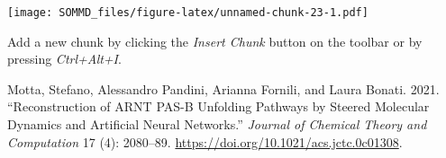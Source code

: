 \documentclass[
]{article}
\newlength{\cslhangindent}
\newlength{\cslentryspacingunit} %
\newenvironment{CSLReferences}[2] %
 {%
  \setlength{\parindent}{0pt}
  \ifodd #1
  \let\oldpar\par
  \def\par{\hangindent=\cslhangindent\oldpar}
  \fi
  \setlength{\parskip}{#2\cslentryspacingunit}
 }%
 {}
\begin{document}
\texttt{[image: SOMMD\_files/figure-latex/unnamed-chunk-23-1.pdf]}

Add a new chunk by clicking the \emph{Insert Chunk} button on the
toolbar or by pressing \emph{Ctrl+Alt+I}.

\hypertarget{refs}{}
\begin{CSLReferences}{1}{0}
\leavevmode{}%
Motta, Stefano, Alessandro Pandini, Arianna Fornili, and Laura Bonati.
2021. {``Reconstruction of ARNT PAS-B Unfolding Pathways by Steered
Molecular Dynamics and Artificial Neural Networks.''} \emph{Journal of
Chemical Theory and Computation} 17 (4): 2080--89.
\url{https://doi.org/10.1021/acs.jctc.0c01308}.

\end{CSLReferences}
\end{document}
